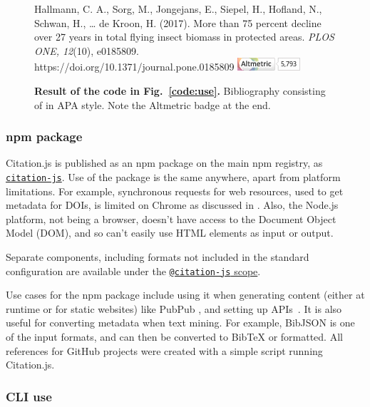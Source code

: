 \documentclass[fleqn,10pt,lineno]{wlpeerj} %
\begin{document}
\begin{figure}[bt!]
\begin{small}
Hallmann, C. A., Sorg, M., Jongejans, E., Siepel, H., Hofland, N., Schwan, H., … de Kroon, H. (2017). More than 75 percent decline over 27 years in total flying insect biomass in protected areas. \emph{PLOS ONE, 12}(10), e0185809. https://doi.org/10.1371/journal.pone.0185809 \includegraphics[height=1.5\fontcharht\font`\B]{altmetric.png}
\end{small}
\caption{\textbf{Result of the code in Fig.~\ref{code:use}.} Bibliography consisting of \cite{hallmann_more_2017} in APA style. Note the Altmetric badge at the end.}
\label{fig:use}
\end{figure}

\subsubsection*{npm package}

Citation.js is published as an npm package on the main npm registry, as \href{https://npm.im/citation-js}{\texttt{citation-js}}. Use of the package is the same anywhere, apart from platform limitations. For example, synchronous requests for web resources, used to get metadata for DOIs, is limited on Chrome as discussed in \cite{willighagen_make_2017}. Also, the Node.js platform, not being a browser, doesn't have access to the Document Object Model (DOM), and so can't easily use HTML elements as input or output.

Separate components, including formats not included in the standard configuration are available under the \href{https://www.npmjs.com/org/citation-js}{\texttt{@citation-js} scope}.

Use cases for the npm package include using it when generating content (either at runtime or for static websites) like PubPub \citep{shihipar_pubpub:_2018}, and setting up APIs~\citep{willighagen_citation.js:_2017}. It is also useful for converting metadata when text mining. For example, BibJSON is one of the input formats, and can then be converted to BibTeX or formatted. All references for GitHub projects were created with a simple script running Citation.js.

\subsubsection*{CLI use}
\end{document}
